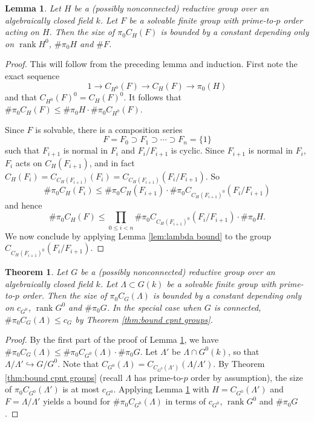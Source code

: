 \documentclass[11pt, letterpaper,english]{amsart}
\theoremstyle{plain}
\newtheorem{lemma}[lem]{Lemma}
\newtheorem{thm}[lem]{Theorem}
\theoremstyle{definition}
\numberwithin{equation}{section}
\numberwithin{lem}{section}
\newcommand{\into}{\hookrightarrow}
\DeclareMathOperator{\rank}{rank}
\newcommand{\cent}[2]{C_{#1}(#2)}
\newcommand{\Ld}{\Lambda}
\begin{document}
\begin{lemma} \label{lem:F bound}
Let $H$ be a (possibly nonconnected) reductive group over an algebraically closed field $k$. Let $F$ be a solvable finite group with prime-to-$p$ order acting on $H$. Then the size of $\pi_0 \cent{H}{F}$ is bounded by a constant depending only on $\rank H^0$, $\#\pi_0 H$ and $\# F$. 
\end{lemma}

\begin{proof}
This will follow from the preceding lemma and induction. 
First note the exact sequence
\[
1 \to \cent{H^0}{F} \to \cent{H}{F} \to \pi_0(H)
\]
and that $\cent{H^0}{F}^0=\cent{H}{F}^0$. It follows that 
$\# \pi_0 \cent{H}{F} \leq \# \pi_0 H \cdot \# \pi_0 \cent{H^0}{F}$.

Since $F$ is solvable, there is a composition series
\[
F=F_0 \supset F_1 \supset \cdots \supset F_n=\{1\}
\]
such that $F_{i+1}$ is normal in $F_i$ and $F_i/F_{i+1}$ is cyclic. 
Since $F_{i+1}$ is normal in $F_i$, $F_i$ acts on $\cent{H}{F_{i+1}}$, and in fact
$\cent{H}{F_i}=\cent{\cent{H}{F_{i+1}}}{F_i}=\cent{\cent{H}{F_{i+1}}}{F_i/F_{i+1}}$. 
So 
\[
\# \pi_0 \cent{H}{F_i} \leq \# \pi_0 \cent{H}{F_{i+1}} \cdot \# \pi_0 \cent{\cent{H}{F_{i+1}}^0}{F_i/F_{i+1}}
\]
and hence
\[
\# \pi_0 \cent{H}{F} \leq \prod_{0 \leq i < n} \# \pi_0 \cent{\cent{H}{F_{i+1}}^0}{F_i/F_{i+1}} \cdot \# \pi_0 H.
\]
We now conclude by applying Lemma \ref{lem:lambda bound} to the group $\cent{\cent{H}{F_{i+1}}^0}{F_i/F_{i+1}}$.
\end{proof}


\begin{thm} \label{thm:bound nonconnected}
Let $G$ be a (possibly nonconnected) reductive group over an algebraically closed field $k$. Let $\Ld \subset G(k)$ be a solvable finite group with prime-to-$p$ order. Then the size of $\pi_0 \cent{G}{\Ld}$ is bounded by a constant depending only on $c_{G^0}$, $\rank G^0$ and $\# \pi_0 G$. In the special case when $G$ is connected, $\# \pi_0 \cent{G}{\Ld} \leq c_G$ by Theorem \ref{thm:bound cpnt groups}.
\end{thm}

\begin{proof}
By the first part of the proof of Lemma \ref{lem:F bound}, we have
$\# \pi_0 \cent{G}{\Ld} \leq \# \pi_0 \cent{G^0}{\Ld} \cdot  \# \pi_0 G$. 
Let $\Ld'$ be $\Ld \cap G^0(k)$, so that $\Ld/\Ld' \into G/G^0$.
Note that $\cent{G^0}{\Ld}=\cent{\cent{G^0}{\Ld'}}{\Ld/\Ld'}$. By Theorem \ref{thm:bound cpnt groups} (recall $\Ld$ has prime-to-$p$ order by assumption), the size of $\pi_0 \cent{G^0}{\Ld'}$ is at most $c_{G^0}$. Applying Lemma \ref{lem:F bound} with $H=\cent{G^0}{\Ld'}$ and $F=\Ld/\Ld'$ yields a bound for $\# \pi_0 \cent{G^0}{\Ld}$ in terms of 
$c_{G^0}$, $\rank G^0$ and $\# \pi_0 G$.
\end{proof}
\end{document}
